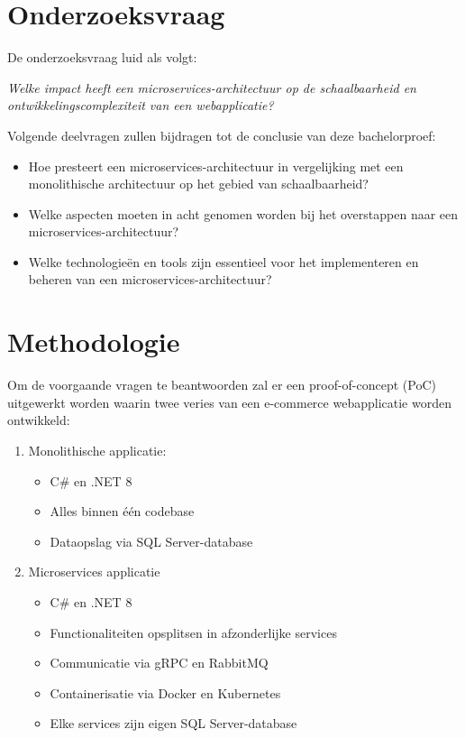 \section{Onderzoeksvraag}

De onderzoeksvraag luid als volgt:

\textit{Welke impact heeft een microservices-architectuur op de schaalbaarheid en ontwikkelingscomplexiteit van een webapplicatie?}

Volgende deelvragen zullen bijdragen tot de conclusie van deze bachelorproef:

\begin{itemize}
	\item Hoe presteert een microservices-architectuur in vergelijking met een monolithische architectuur op het gebied van schaalbaarheid?
	\item Welke aspecten moeten in acht genomen worden bij het overstappen naar een microservices-architectuur?
	\item Welke technologieën en tools zijn essentieel voor het implementeren en beheren van een microservices-architectuur?
\end{itemize}

\section{Methodologie}

Om de voorgaande vragen te beantwoorden zal er een proof-of-concept (PoC) uitgewerkt worden waarin twee veries van een e-commerce webapplicatie worden ontwikkeld:

\begin{enumerate}
	\item Monolithische applicatie:
	\begin{itemize}
		\item C\# en .NET 8
		\item Alles binnen één codebase
		\item Dataopslag via SQL Server-database
	\end{itemize}
	\item Microservices applicatie
	\begin{itemize}
		\item C\# en .NET 8
		\item Functionaliteiten opsplitsen in afzonderlijke services
		\item Communicatie via gRPC en RabbitMQ
		\item Containerisatie via Docker en Kubernetes
		\item Elke services zijn eigen SQL Server-database
	\end{itemize}
\end{enumerate}

